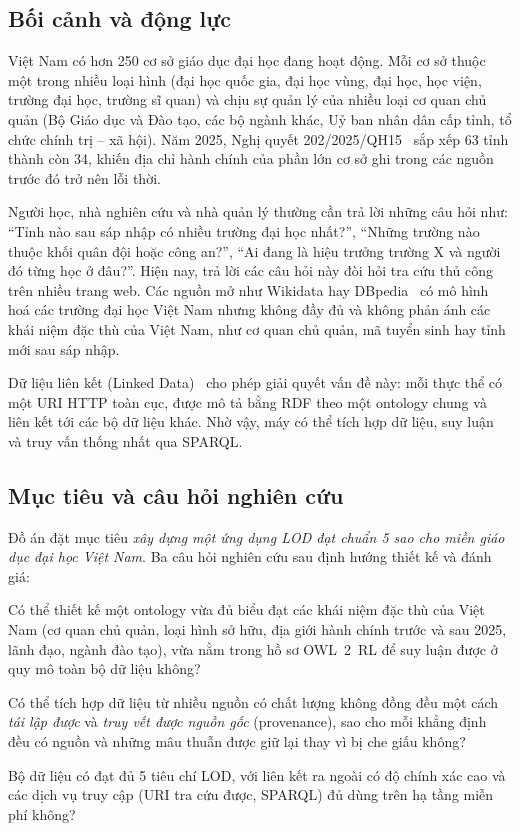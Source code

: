 \documentclass[12pt,a4paper]{article}
\newcommand{\RQ}[1]{\textbf{RQ#1}}
\begin{document}
\subsection{Bối cảnh và động lực}
Việt Nam có hơn 250 cơ sở giáo dục đại học đang hoạt động. Mỗi cơ sở thuộc một trong nhiều loại hình (đại học quốc
gia, đại học vùng, đại học, học viện, trường đại học, trường sĩ quan) và chịu sự quản lý của nhiều loại cơ quan chủ
quản (Bộ Giáo dục và Đào tạo, các bộ ngành khác, Uỷ ban nhân dân cấp tỉnh, tổ chức chính trị -- xã hội). Năm 2025,
Nghị quyết 202/2025/QH15~\cite{vn2025nq202} sắp xếp 63 tỉnh thành còn 34, khiến địa chỉ hành chính của phần lớn cơ sở ghi
trong các nguồn trước đó trở nên lỗi thời.

Người học, nhà nghiên cứu và nhà quản lý thường cần trả lời những câu hỏi như: ``Tỉnh nào sau sáp nhập có nhiều trường
đại học nhất?'', ``Những trường nào thuộc khối quân đội hoặc công an?'', ``Ai đang là hiệu trưởng trường X và người đó
từng học ở đâu?''. Hiện nay, trả lời các câu hỏi này đòi hỏi tra cứu thủ công trên nhiều trang web. Các nguồn mở như
Wikidata hay DBpedia~\cite{vrandecic2014wikidata,lehmann2015dbpedia} có mô hình hoá các trường đại học Việt Nam nhưng
không đầy đủ và không phản ánh các khái niệm đặc thù của Việt Nam, như cơ quan chủ quản, mã tuyển sinh hay tỉnh mới
sau sáp nhập.

Dữ liệu liên kết (Linked Data)~\cite{bizer2009linked,heath2011linked} cho phép giải quyết vấn đề này: mỗi thực thể có
một URI HTTP toàn cục, được mô tả bằng RDF theo một ontology chung và liên kết tới các bộ dữ liệu khác. Nhờ vậy, máy có
thể tích hợp dữ liệu, suy luận và truy vấn thống nhất qua SPARQL.

\subsection{Mục tiêu và câu hỏi nghiên cứu}
Đồ án đặt mục tiêu \emph{xây dựng một ứng dụng LOD đạt chuẩn 5 sao cho miền giáo dục đại học Việt Nam}. Ba câu hỏi
nghiên cứu sau định hướng thiết kế và đánh giá:

\begin{description}[leftmargin=1.2cm,style=nextline]
  \item[\RQ{1}] Có thể thiết kế một ontology vừa đủ biểu đạt các khái niệm đặc thù của Việt Nam (cơ quan chủ quản, loại
  hình sở hữu, địa giới hành chính trước và sau 2025, lãnh đạo, ngành đào tạo), vừa nằm trong hồ sơ OWL~2~RL để suy
  luận được ở quy mô toàn bộ dữ liệu không?
  \item[\RQ{2}] Có thể tích hợp dữ liệu từ nhiều nguồn có chất lượng không đồng đều một cách \emph{tái lập được} và
  \emph{truy vết được nguồn gốc} (provenance), sao cho mỗi khẳng định đều có nguồn và những mâu thuẫn được giữ lại thay
  vì bị che giấu không?
  \item[\RQ{3}] Bộ dữ liệu có đạt đủ 5 tiêu chí LOD, với liên kết ra ngoài có độ chính xác cao và các dịch vụ truy cập
  (URI tra cứu được, SPARQL) đủ dùng trên hạ tầng miễn phí không?
\end{description}
\end{document}
